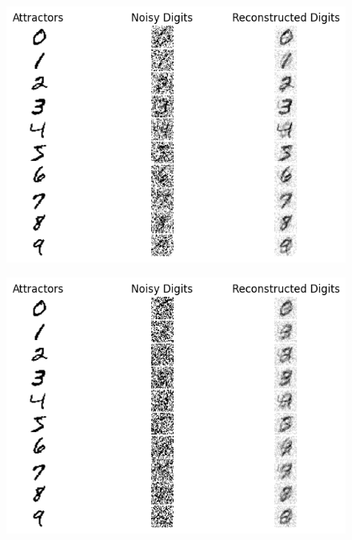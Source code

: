 \begin{figure}[h!]
    \begin{minipage}[t]{0.24\textwidth}
        \includegraphics[width=\textwidth]{figures/hopfield-digits-20-noise-1-it.png}
        \label{fig:hopfield-digits-20-noise-1-it}
    \end{minipage}
    \begin{minipage}[t]{0.24\textwidth}
        \includegraphics[width=\textwidth]{figures/hopfield-digits-40-noise-1-it.png}
        \label{fig:hopfield-digits-40-noise-1-it}
    \end{minipage}
    \begin{minipage}[t]{0.24\textwidth}

\end{minipage}
\end{figure}
